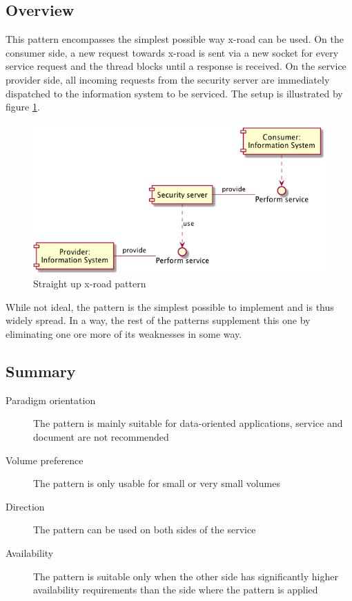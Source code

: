 \documentclass[10pt,a4paper]{article}
\begin{document}
\subsection{Overview}
This pattern encompasses the simplest possible way x-road can be used. On the consumer side, a new request towards x-road is sent via a new socket for every service request and the thread blocks until a response is received. On the service provider side, all incoming requests from the security server are immediately dispatched to the information system to be serviced. The setup is illustrated by figure \ref{fig:p:1}. 

\begin{figure}[htp]
	\begin{center}
		\includegraphics[width=1\textwidth]{gfx/1_comp.png}
		\caption{Straight up x-road pattern}
		\label{fig:p:1}
	\end{center}
\end{figure}

While not ideal, the pattern is the simplest possible to implement and is thus widely spread. In a way, the rest of the patterns supplement this one by eliminating one ore more of its weaknesses in some way.

\subsection{Summary}
\begin{description}
	\item[Paradigm orientation] The pattern is mainly suitable for data-oriented applications, service and document are not recommended
	\item[Volume preference] The pattern is only usable for small or very small volumes
	\item[Direction] The pattern can be used on both sides of the service
	\item[Availability] The pattern is suitable only when the other side has significantly higher availability requirements than the side where the pattern is applied
\end{description}
\end{document}

